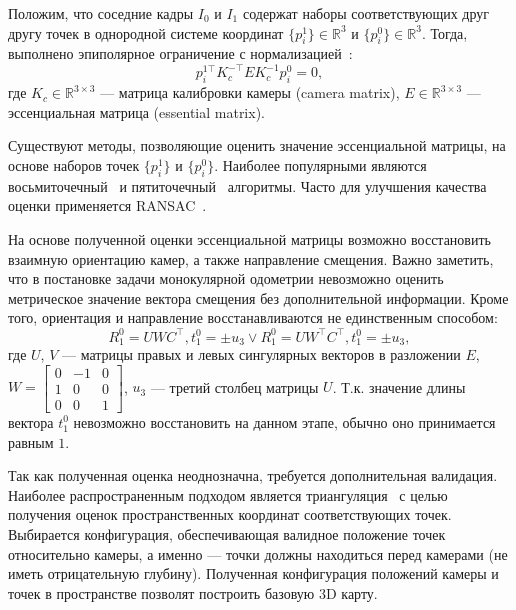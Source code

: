 Положим, что соседние кадры $I_{0}$ и $I_1$ содержат наборы соответствующих друг 
другу точек в однородной системе координат $\{p^1_i\} \in \mathbb{R}^3$ и 
$\{p^{0}_i\} \in \mathbb{R}^3$. Тогда, выполнено эпиполярное ограничение 
с нормализацией~\cite{zhang1998determining}:
\begin{equation}
    p^{1\top}_i K_c^{-\top} E K_c^{-1} p^{0}_i=0,
\end{equation}
где $K_c \in \mathbb{R}^{3\times 3}$ --- матрица калибровки камеры (camera matrix), 
$E\in \mathbb{R}^{3\times 3}$ --- эссенциальная матрица (essential matrix).

Существуют методы, позволяющие оценить значение эссенциальной матрицы, на 
основе наборов точек $\{p^1_i\}$ и $\{p^{0}_i\}$. Наиболее популярными являются 
восьмиточечный~\cite{hartley1997defense} и пятиточечный~\cite{nister2004efficient} 
алгоритмы. Часто для улучшения качества оценки применяется RANSAC~\cite{fischler1981random}.

На основе полученной оценки эссенциальной матрицы возможно восстановить взаимную
ориентацию камер, а также направление смещения. Важно заметить, что в постановке 
задачи монокулярной одометрии невозможно оценить метрическое значение вектора смещения
без дополнительной информации. Кроме того, ориентация и направление восстанавливаются
не единственным способом:
\begin{equation}
R^{0}_1 = UWC^\top, t^{0}_1 = \pm u_3 \vee R^{0}_1 = UW^\top C^\top, t^{0}_1 = \pm u_3,
\end{equation}
где $U$, $V$ --- матрицы правых и левых сингулярных векторов в разложении $E$, $W = \begin{bmatrix}
    0 & -1 & 0 \\ 1 & 0 & 0 \\ 0 & 0 & 1
\end{bmatrix}$, $u_3$ --- третий столбец матрицы $U$. Т.к. значение длины вектора $t^{0}_1$
невозможно восстановить на данном этапе, обычно оно принимается равным $1$.

Так как полученная оценка неоднозначна, требуется дополнительная валидация. Наиболее
распространенным подходом является триангуляция~\cite{thurmond2001point} с целью получения оценок 
пространственных координат соответствующих точек. Выбирается конфигурация, обеспечивающая
валидное положение точек относительно камеры, а именно --- точки должны находиться перед 
камерами (не иметь отрицательную глубину). Полученная конфигурация положений камеры и
точек в пространстве позволят построить базовую 3D карту.

